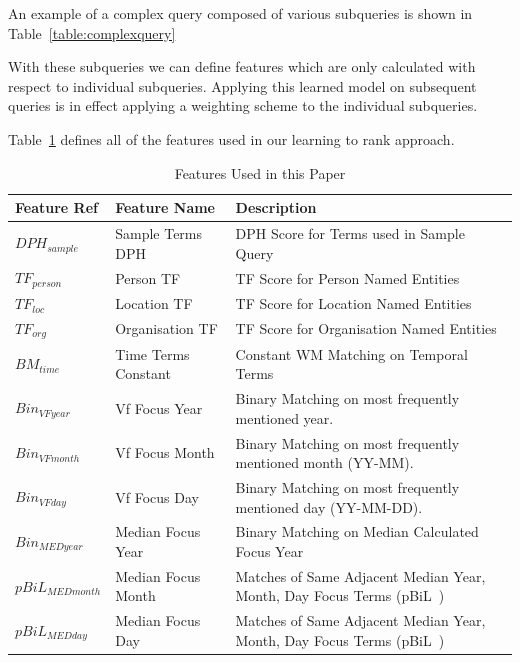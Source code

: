 \documentclass{mpaper}
\let\oldcite=\cite
\renewcommand\cite[1]{\ifthenelse{\equal{#1}{NEEDED}}{\ensuremath{^\texttt{[citation~needed]}}}{\oldcite{#1}}}
\begin{document}
An example of a complex query composed of various subqueries is shown in Table~\ref{table:complexquery}

With these subqueries we can define features which are only calculated with respect to individual subqueries. Applying this learned model on subsequent queries is in effect applying a weighting scheme to the individual subqueries.

Table~\ref{table:features} defines all of the features used in our learning to rank approach.


\begin{table}[t] 
\centering
\begin{tabular}{|p{2cm}|p{4cm}|p{6cm}|}
\hline
Feature Ref   & Feature Name 		& Description  \\ \hline
$DPH_{sample}$ & Sample Terms DPH 	& DPH Score for Terms used in Sample Query \\ \hline
$TF_{person}$ &Person TF 		& TF Score for Person Named Entities \\
$TF_{loc}$&Location TF 		
& TF Score for Location Named Entities 		\\ 
$TF_{org}$&Organisation TF 	
& TF Score for Organisation Named Entities  \\
\hline
$BM_{time} $&Time Terms Constant 
& Constant WM Matching on Temporal Terms    \\
\hline
$Bin_{VFyear}$ & Vf Focus Year 		
& Binary Matching on most frequently mentioned year. \\
$Bin_{VFmonth}$ & Vf Focus Month 		
&Binary Matching on most frequently mentioned month (YY-MM). \\
$Bin_{VFday}$ & Vf Focus Day 		
& Binary Matching on most frequently mentioned day (YY-MM-DD).\\
\hline
$Bin_{MEDyear} $& Median Focus Year 	
& Binary Matching on Median Calculated Focus Year 		  \\ 
$pBiL_{MEDmonth} $& Median Focus Month 	
&Matches of Same Adjacent Median Year, Month, Day Focus Terms (pBiL~\cite{pbil}) \\ 
$pBiL_{MEDday} $& Median Focus Day 	
& Matches of Same Adjacent Median Year, Month, Day Focus Terms (pBiL~\cite{pbil}) \\ \hline
\end{tabular}
\caption{Features Used in this Paper}
\label{table:features}
\end{table}
\end{document}
